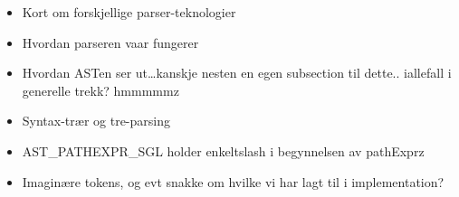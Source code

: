 \begin{itemize}
  \item Kort om forskjellige parser-teknologier
  \item Hvordan parseren vaar fungerer
  \item Hvordan ASTen ser ut\ldots kanskje nesten en egen subsection til
  dette.. iallefall i generelle trekk? hmmmmmz
  \item Syntax-tr\ae r og tre-parsing
  \item AST\_PATHEXPR\_SGL holder enkeltslash i begynnelsen av pathExprz
  \item Imagin\ae re tokens, og evt snakke om hvilke vi har lagt til i
  implementation?
\end{itemize}
